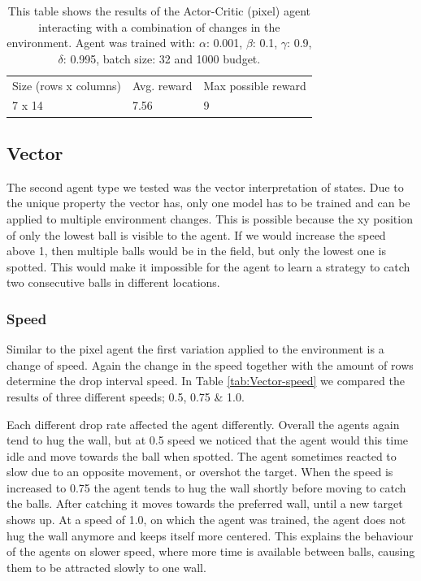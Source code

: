 \documentclass{article}
\begin{document}
\begin{table}[]
\begin{tabular}{lll}
Size (rows x columns) & Avg. reward & Max possible reward \\
7 x 14                & 7.56        & 9                  
\end{tabular}
\caption{This table shows the results of the Actor-Critic (pixel) agent interacting with a combination of changes in the environment. 
Agent was trained with: $\alpha$: 0.001, $\beta$: 0.1, $\gamma$: 0.9, $\delta$: 0.995, batch size: 32 and 1000 budget. }
\label{tab:Pixel-comb}
\end{table}


\subsection{Vector}
\label{ENV-vars}
The second agent type we tested was the vector interpretation of states.
Due to the unique property the vector has, only one model has to be trained and can be applied to multiple environment changes.
This is possible because the xy position of only the lowest ball is visible to the agent. 
If we would increase the speed above 1, then multiple balls would be in the field, but only the lowest one is spotted.
This would make it impossible for the agent to learn a strategy to catch two consecutive balls in different locations. 

\subsubsection{Speed}
Similar to the pixel agent the first variation applied to the environment is a change of speed.
Again the change in the speed together with the amount of rows determine the drop interval speed. 
In Table \ref{tab:Vector-speed} we compared the results of three different speeds; 0.5, 0.75 \& 1.0. 

Each different drop rate affected the agent differently. 
Overall the agents again tend to hug the wall, but at 0.5 speed we noticed that the agent would this time idle and move towards the ball when spotted.
The agent sometimes reacted to slow due to an opposite movement, or overshot the target. 
When the speed is increased to 0.75 the agent tends to hug the wall shortly before moving to catch the balls.
After catching it moves towards the preferred wall, until a new target shows up.
At a speed of 1.0, on which the agent was trained, the agent does not hug the wall anymore and keeps itself more centered.
This explains the behaviour of the agents on slower speed, where more time is available between balls, causing them to be attracted slowly to one wall. 
\end{document}
